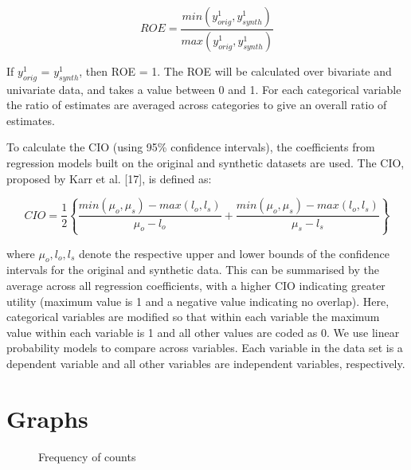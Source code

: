 \documentclass[12pt]{article}
\begin{document}
\begin{equation}
    ROE = \frac{min(y^1_{orig},y^1_{synth})}{max(y^1_{orig},y^1_{synth})}
\end{equation}

If $y^1_{orig}$ = $y^1_{synth}$, then ROE = 1.  The ROE will be calculated over bivariate and univariate data, and takes a value between 0 and 1. For each categorical variable the ratio of estimates are averaged across categories to give an overall ratio of estimates.

To calculate the CIO (using 95\% confidence intervals), the coefficients from regression models built on the original and synthetic datasets are used. The CIO, proposed by Karr et al. [17], is defined as:

\begin{equation}
    CIO = \frac{1}{2}\left\{\frac{min(\mu_o,\mu_s)-max(l_o,l_s)}{\mu_o - l_o} + \frac{min(\mu_o,\mu_s)-max(l_o,l_s)}{\mu_s - l_s}\right\}
\end{equation}

where $\mu_o, l_o, l_s$ denote the respective upper and lower bounds of the confidence intervals for the original and synthetic data. This can be summarised by the average across all regression coefficients, with a higher CIO indicating greater utility (maximum value is 1 and a negative value indicating no overlap).  Here, categorical variables are modified so that within each variable the maximum value within each variable is 1 and all other values are coded as 0.  We use linear probability models to compare across variables.  Each variable in the data set is a dependent variable and all other variables are independent variables, respectively.

\clearpage
\section{Graphs}

\begin{figure}[!h]
    \centering
    \caption{Frequency of counts}
    \label{graph_datasynthesizer_frequency}
\end{figure}
\end{document}
